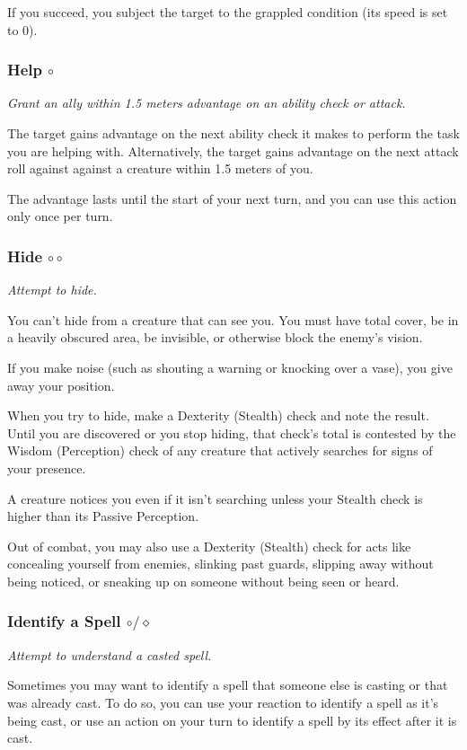     If you succeed, you subject the target to the grappled condition (its speed is set to 0).
\subsubsection{Help $\circ$} \label{act::help}
    \textit{Grant an ally within 1.5 meters advantage on an ability check or attack.}

    The target gains advantage on the next ability check it makes to perform the task you are helping with.
    Alternatively, the target gains advantage on the next attack roll against against a creature within 1.5 meters of you.

    The advantage lasts until the start of your next turn, and you can use this action only once per turn.
\subsubsection{Hide $\circ\circ$} \label{act::hide}
    \textit{Attempt to hide.}

    You can't hide from a creature that can see you.
    You must have total cover, be in a heavily obscured area, be invisible, or otherwise block the enemy's vision.

    If you make noise (such as shouting a warning or knocking over a vase), you give away your position.

    When you try to hide, make a Dexterity (Stealth) check and note the result.
    Until you are discovered or you stop hiding, that check's total is contested by the Wisdom (Perception) check of any creature that actively searches for signs of your presence.

    A creature notices you even if it isn't searching unless your Stealth check is higher than its Passive Perception.

    Out of combat, you may also use a Dexterity (Stealth) check for acts like concealing yourself from enemies, slinking past guards, slipping away without being noticed, or sneaking up on someone without being seen or heard.
\subsubsection{Identify a Spell $\circ/\diamond$} \label{act::identifyaspell}
    \textit{Attempt to understand a casted spell.}

    Sometimes you may want to identify a spell that someone else is casting or that was already cast.
    To do so, you can use your reaction to identify a spell as it's being cast, or use an action on your turn to identify a spell by its effect after it is cast.

